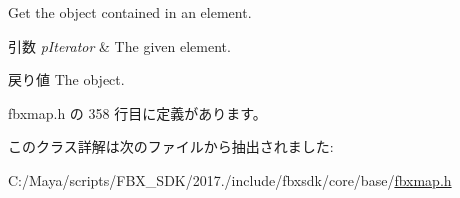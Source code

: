 Get the object contained in an element. 
\begin{DoxyParams}{引数}
{\em p\+Iterator} & The given element. \\
\hline
\end{DoxyParams}
\begin{DoxyReturn}{戻り値}
The object. 
\end{DoxyReturn}


 fbxmap.\+h の 358 行目に定義があります。



このクラス詳解は次のファイルから抽出されました\+:\begin{DoxyCompactItemize}
\item 
C\+:/\+Maya/scripts/\+F\+B\+X\+\_\+\+S\+D\+K/2017./include/fbxsdk/core/base/\hyperlink{fbxmap_8h}{fbxmap.\+h}\end{DoxyCompactItemize}
